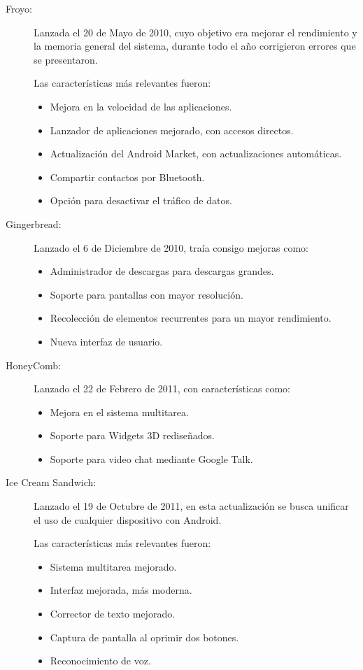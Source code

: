 \begin{description}
	\item[Froyo:]
		Lanzada el 20 de Mayo de 2010, cuyo objetivo era mejorar el rendimiento y la memoria general del sistema, durante todo el año corrigieron errores que se presentaron.
 
		Las características más relevantes fueron:
		\begin{itemize}
			\item Mejora en la velocidad de las aplicaciones.
			\item Lanzador de aplicaciones mejorado, con accesos directos.
			\item Actualización del Android Market, con actualizaciones automáticas.
			\item Compartir contactos por Bluetooth.
			\item Opción para desactivar el tráfico de datos.
		\end{itemize}
	
	\item[Gingerbread:]
		Lanzado el 6 de Diciembre de 2010, traía consigo mejoras como:
		\begin{itemize}
			\item Administrador de descargas para descargas grandes.
			\item Soporte para pantallas con mayor resolución.
			\item Recolección de elementos recurrentes para un mayor rendimiento.
			\item Nueva interfaz de usuario.
		\end{itemize}
	
	\item[HoneyComb:]
		Lanzado el 22 de Febrero de 2011, con características como:
		\begin{itemize}
			\item Mejora en el sistema multitarea.
			\item Soporte para Widgets 3D rediseñados.
			\item Soporte para video chat mediante Google Talk.
		\end{itemize}
		
	\item[Ice Cream Sandwich:]
		 Lanzado el 19 de Octubre de 2011, en esta actualización se busca unificar el uso de cualquier dispositivo con Android.
		 
		 Las características más relevantes fueron:
		 \begin{itemize}
		 	\item Sistema multitarea mejorado.
		 	\item Interfaz mejorada, más moderna.
		 	\item Corrector de texto mejorado.
		 	\item Captura de pantalla al oprimir dos botones.
		 	\item Reconocimiento de voz.
		 \end{itemize}
		

\end{description}
